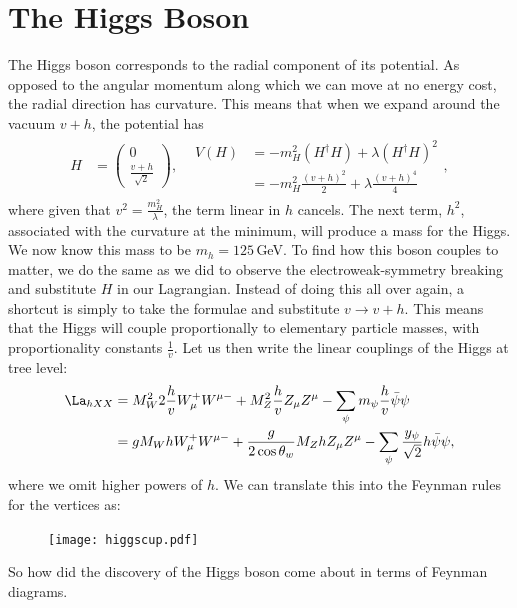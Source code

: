 \documentclass[relqm.tex]{subfiles}
\begin{document}
\section{The Higgs Boson}
The Higgs boson corresponds to the radial component of its potential. 
As opposed to the angular momentum along which we can move at no energy cost, the radial direction has curvature. 
This means that when we expand around the vacuum $v+h$, the potential has
\begin{align}
    H &= \begin{pmatrix} 0 \\ \frac{v+h}{\sqrt{2}} \end{pmatrix}, & \begin{split} V(H) &= -m_H^2(H^\dagger H) + \lambda(H^\dagger H)^2 \\ &= -m_H^2\frac{(v+h)^2}{2}+\lambda\frac{(v+h)^4}{4}\end{split},
\end{align}
where given that $v^2=\frac{m_H^2}{\lambda}$, the term linear in $h$ cancels. 
The next term, $h^2$, associated with the curvature at the minimum, will produce a mass for the Higgs. 
We now know this mass to be $m_h=125\,$GeV.
To find how this boson couples to matter, we do the same as we did to observe the electroweak-symmetry breaking and substitute $H$ in our Lagrangian. 
Instead of doing this all over again, a shortcut is simply to take the formulae and substitute $v\to v+h$. 
This means that the Higgs will couple proportionally to elementary particle masses, with proportionality constants $\frac{1}{v}$. 
Let us then write the linear couplings of the Higgs at tree level:
\begin{align}
    \begin{split}
        \La_{hXX} &= M_W^2 2\frac{h}{v}W_\mu^+ W^{\mu-} + M_Z^2\frac{h}{v}Z_\mu Z^\mu - \sum_{\psi} m_\psi \frac{h}{v}\bar{\psi}\psi \\
                  &= gM_WhW_\mu^+ W^{\mu-} + \frac{g}{2\cos\theta_w}M_ZhZ_\mu Z^\mu - \sum_{\psi}\frac{y_\psi}{\sqrt{2}}h\bar{\psi}\psi,
    \end{split}
\end{align}
where we omit higher powers of $h$. 
We can translate this into the Feynman rules for the vertices as:
\begin{figure}[H]
    \centering
    \texttt{[image: higgscup.pdf]}
    \vspace{-10pt}
\end{figure}
So how did the discovery of the Higgs boson come about in terms of Feynman diagrams. 
\end{document}
